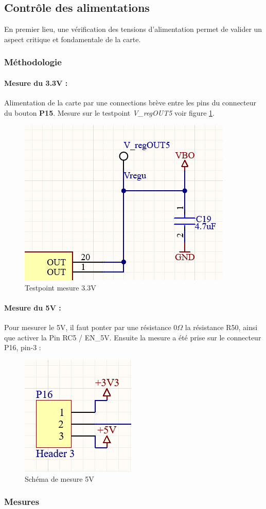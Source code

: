 \subsection{Contrôle des alimentations}
{
	En premier lieu, une vérification des tensions d'alimentation permet de valider un aspect critique et fondamentale de la carte.
	\subsubsection{Méthodologie}
	\paragraph{Mesure du 3.3V :} Alimentation de la carte par une connections brève entre les pins du connecteur du bouton \textbf{P15}. Mesure sur le testpoint \textit{V\_regOUT5} voir figure \ref{fig:sch3}.
	\begin{figure}[h]
		\centering
		\includegraphics[width=0.3\linewidth]{Figures/DEV_MEAS/Sch3.3V}
		\caption{Testpoint mesure 3.3V}
		\label{fig:sch3}
	\end{figure}
	
	\paragraph{Mesure du 5V :} Pour mesurer le 5V, il faut ponter par une résistance $0\Omega$ la résistance R50, ainsi que activer la Pin RC5 / EN\_5V. Ensuite la mesure a été prise sur le connecteur P16, pin-3 :
	\begin{figure}[h]
		\centering
		\includegraphics[width=0.2\linewidth]{Figures/DEV_MEAS/Sch5V}
		\caption{Schéma de mesure 5V}
		\label{fig:sch5v}
	\end{figure}

	\clearpage
	
	\subsubsection{Mesures}
	
}
